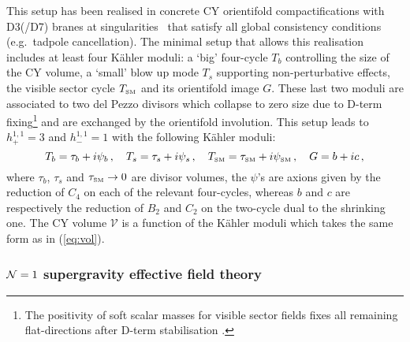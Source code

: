\documentclass[11pt,a4paper]{article}
\newcommand{\be}{\begin{equation}}
\newcommand{\ee}{\end{equation}}
\def\SM{{\scriptscriptstyle \rm SM}}
\newcommand\vo{{\mathcal{V}}}
\begin{document}
This setup has been realised in concrete CY orientifold compactifications with D3(/D7) branes at singularities~\cite{Cicoli:2012vw,Cicoli:2013mpa,Cicoli:2013cha} that satisfy all global consistency conditions (e.g.~tadpole cancellation).
The minimal setup that allows this realisation includes at least four K\"ahler moduli:
a `big' four-cycle $T_b$ controlling the size of the CY volume, a `small' blow up mode $T_s$
supporting non-perturbative effects, the visible sector cycle $T_\SM$ and its orientifold image $G$.
These last two moduli are associated to two del Pezzo divisors which collapse to zero size due to D-term fixing\footnote{The positivity of soft scalar masses for visible sector fields fixes all remaining flat-directions after D-term stabilisation \cite{Cicoli:2012vw}.}
and are exchanged by the orientifold involution.
This setup leads to $h^{1,1}_+ = 3$ and $h^{1,1}_- = 1$ with the following K\"ahler moduli:
\be
T_b = \tau_b + i \psi_b\,, \quad T_s = \tau_s + i \psi_s\,, \quad T_\SM = \tau_\SM + i \psi_\SM\,, \quad G = b + i c\,,
\label{eq:cycles}
\ee
where $\tau_b$, $\tau_s$ and $\tau_\SM\to 0$ are divisor volumes, the $\psi$'s are axions given by the reduction of $C_4$ on each of the relevant four-cycles,
whereas $b$ and $c$ are respectively the reduction of $B_2$ and $C_2$ on the two-cycle dual to the shrinking one.
The CY volume $\vo$ is a function of the K\"ahler moduli which takes the same form as in (\ref{eq:vol}).


\subsubsection{${\cal N} = 1$ supergravity effective field theory}
\end{document}
